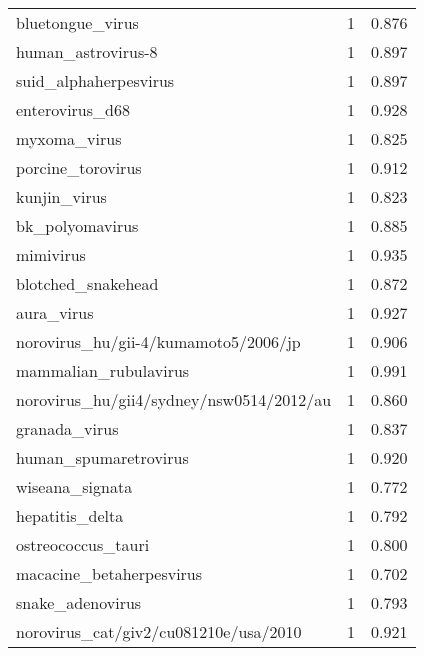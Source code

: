 \begin{tabular}{lrr}
                         bluetongue\_virus &                   1 &     0.876 \\
                       human\_astrovirus-8 &                   1 &     0.897 \\
                    suid\_alphaherpesvirus &                   1 &     0.897 \\
                          enterovirus\_d68 &                   1 &     0.928 \\
                             myxoma\_virus &                   1 &     0.825 \\
                        porcine\_torovirus &                   1 &     0.912 \\
                             kunjin\_virus &                   1 &     0.823 \\
                          bk\_polyomavirus &                   1 &     0.885 \\
                                mimivirus &                   1 &     0.935 \\
                       blotched\_snakehead &                   1 &     0.872 \\
                               aura\_virus &                   1 &     0.927 \\
     norovirus\_hu/gii-4/kumamoto5/2006/jp &                   1 &     0.906 \\
                    mammalian\_rubulavirus &                   1 &     0.991 \\
 norovirus\_hu/gii4/sydney/nsw0514/2012/au &                   1 &     0.860 \\
                            granada\_virus &                   1 &     0.837 \\
                    human\_spumaretrovirus &                   1 &     0.920 \\
                          wiseana\_signata &                   1 &     0.772 \\
                          hepatitis\_delta &                   1 &     0.792 \\
                       ostreococcus\_tauri &                   1 &     0.800 \\
                 macacine\_betaherpesvirus &                   1 &     0.702 \\
                         snake\_adenovirus &                   1 &     0.793 \\
    norovirus\_cat/giv2/cu081210e/usa/2010 &                   1 &     0.921 \\

\end{tabular}
